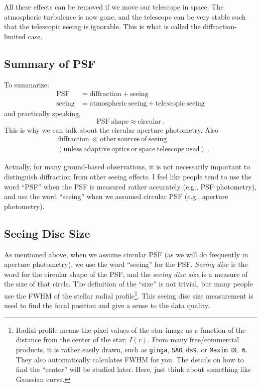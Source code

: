 All these effects can be removed if we move our telescope in space. The atmospheric turbulence is now gone, and the telescope can be very stable such that the telescopic seeing is ignorable. This is what is called the diffraction-limited case.


\subsection{Summary of PSF}

To summarize:
\begin{align*}
  \mathrm{PSF} &= \mathrm{diffraction} + \mathrm{seeing} \\
  \mathrm{seeing} &= \mathrm{atmospheric~seeing} + \mathrm{telescopic~seeing}
\end{align*}
and practically speaking,
\begin{equation*}
  \mathrm{PSF~shape} \approx \mathrm{circular} ~.
\end{equation*}
This is why we can talk about the circular aperture photometry. Also
\begin{align*}
  &\mathrm{diffraction} \ll \mathrm{other~sources~of~seeing} \\ &\mathrm{(unless~adaptive~optics~or~space~telescope~used)} ~.
\end{align*}

Actually, for many ground-based observations, it is not necessarily important to distinguish diffraction from other seeing effects. I feel like people tend to use the word ``PSF'' when the PSF is measured rather accurately (e.g., PSF photometry), and use the word ``seeing'' when we assumed circular PSF (e.g., aperture photometry). 

\subsection{Seeing Disc Size}
As mentioned above, when we assume circular PSF (as we will do frequently in aperture photometry), we use the word ``seeing'' for the PSF. \textit{Seeing disc} is the word for the circular shape of the PSF, and the \textit{seeing disc size} is a measure of the size of that circle. The definition of the ``size'' is not trivial, but many people use the FWHM of the stellar radial profile\footnote{Radial profile means the pixel values of the star image as a function of the distance from the center of the star: $ I(r) $. From many free/commercial products, it is rather easily drawn, such as \texttt{ginga}, \texttt{SAO ds9}, or \texttt{Maxim DL 6}. They also automatically calculates FWHM for you. The details on how to find the ``center'' will be studied later. Here, just think about something like Gaussian curve.}. This seeing disc size measurement is used to find the focal position and give a sense to the data quality.

